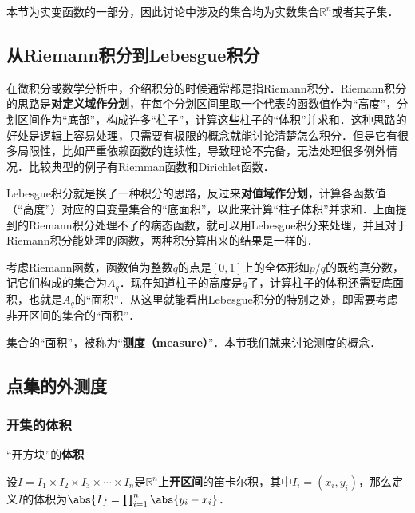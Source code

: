 


本节为实变函数的一部分，因此讨论中涉及的集合均为实数集合$\mathbb{R}^n$或者其子集．


\subsection{从Riemann积分到Lebesgue积分}


在微积分或数学分析中，介绍积分的时候通常都是指Riemann积分．Riemann积分的思路是\textbf{对定义域作分划}，在每个分划区间里取一个代表的函数值作为“高度”，分划区间作为“底部”，构成许多“柱子”，计算这些柱子的“体积”并求和．这种思路的好处是逻辑上容易处理，只需要有极限的概念就能讨论清楚怎么积分．但是它有很多局限性，比如严重依赖函数的连续性，导致理论不完备，无法处理很多例外情况．比较典型的例子有Riemman函数和Dirichlet函数．

Lebesgue积分就是换了一种积分的思路，反过来\textbf{对值域作分划}，计算各函数值（“高度”）对应的自变量集合的“底面积”，以此来计算“柱子体积”并求和．上面提到的Riemann积分处理不了的病态函数，就可以用Lebesgue积分来处理，并且对于Riemann积分能处理的函数，两种积分算出来的结果是一样的．

考虑Riemann函数，函数值为整数$q$的点是$[0, 1]$上的全体形如$p/q$的既约真分数，记它们构成的集合为$A_q$．现在知道柱子的高度是$q$了，计算柱子的体积还需要底面积，也就是$A_q$的“面积”．从这里就能看出Lebesgue积分的特别之处，即需要考虑非开区间的集合的“面积”．

集合的“面积”，被称为“\textbf{测度（measure）}”．本节我们就来讨论测度的概念．



\subsection{点集的外测度}

\subsubsection{开集的体积}

\begin{definition}{“开方块”的\textbf{体积}}\label{SetMet_def1}

设$I=I_1\times I_2\times I_3\times\cdots\times I_n$是$\mathbb{R}^n$上\textbf{开区间}的笛卡尔积，其中$I_i=(x_i, y_i)$，那么定义$I$的体积为$\abs{I} = \prod_{i=1}^n \abs{y_i-x_i}$．

\end{definition}

